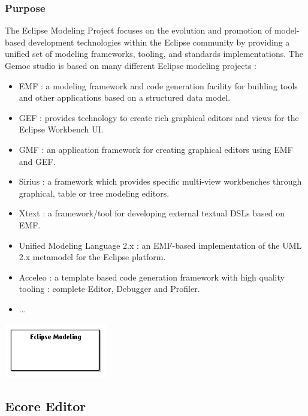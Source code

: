 \documentclass{gemoc} %
\begin{document}
\subsubsection{Purpose}
The Eclipse Modeling Project focuses on the evolution and promotion of model-based development technologies within the Eclipse community by providing a unified set of modeling frameworks, tooling, and standards implementations. The Gemoc studio is based on many different Eclipse modeling projects :
\begin{itemize}
\item EMF : a modeling framework and code generation facility for building tools and other applications based on a structured data model.
\item GEF : provides technology to create rich graphical editors and views for the Eclipse Workbench UI.
\item GMF : an application framework for creating graphical editors using EMF and GEF.
\item Sirius : a framework which provides specific multi-view workbenches through graphical, table or tree modeling editors.
\item Xtext : a framework/tool for developing external textual DSLs based on EMF.
\item Unified Modeling Language 2.x : an EMF-based implementation of the UML 2.x metamodel for the Eclipse platform.
\item Acceleo : a template based code generation framework with high quality tooling : complete Editor, Debugger and Profiler.
\item ...
\end{itemize}

\begin{center}
\includegraphics*[trim=0.0cm 0.0cm 0cm 0.0cm, clip=true]{../images/generated/Generated_Eclipse_Modeling.png}
\end{center}




\subsection{Ecore Editor}
\end{document}
